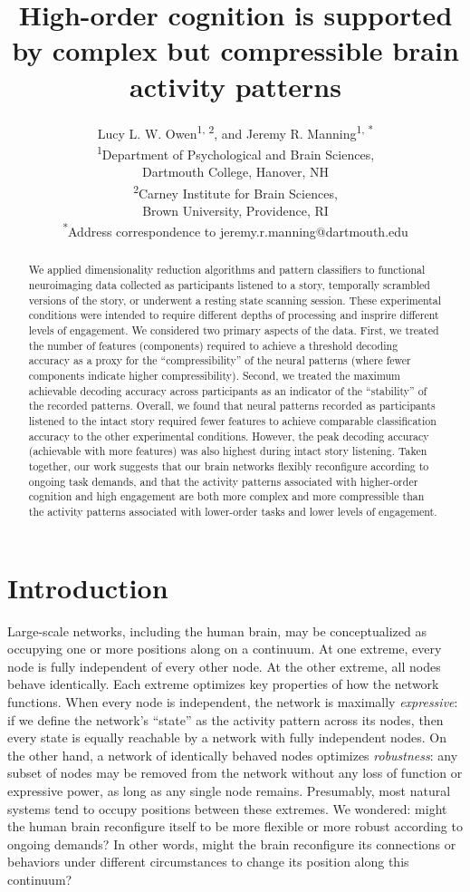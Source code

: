 \documentclass[english]{article}
\title{High-order cognition is supported by complex but compressible brain activity patterns}
\author{Lucy L. W. Owen\textsuperscript{1, 2}, and Jeremy R. Manning\textsuperscript{1,
*}\\\textsuperscript{1}Department of Psychological and Brain Sciences,\\Dartmouth College,
Hanover, NH\\[0.1cm]\textsuperscript{2}Carney Institute for Brain Sciences,\\Brown University,
Providence, RI\\[0.1cm] \textsuperscript{*}Address correspondence to
jeremy.r.manning@dartmouth.edu}
\begin{document}
\maketitle


\begin{abstract} 

We applied dimensionality reduction algorithms and pattern classifiers to
functional neuroimaging data collected as participants listened to a story,
temporally scrambled versions of the story, or underwent a resting state
scanning session. These experimental conditions were intended to require
different depths of processing and insprire different levels of engagement. We
considered two primary aspects of the data. First, we treated the number of
features (components) required to achieve a threshold decoding accuracy as a
proxy for the ``compressibility'' of the neural patterns (where fewer
components indicate higher compressibility). Second, we treated the maximum
achievable decoding accuracy across participants as an indicator of the
``stability'' of the recorded patterns. Overall, we found that neural patterns
recorded as participants listened to the intact story required fewer features
to achieve comparable classification accuracy to the other experimental
conditions. However, the peak decoding accuracy (achievable with more features)
was also highest during intact story listening. Taken together, our work
suggests that our brain networks flexibly reconfigure according to ongoing task
demands, and that the activity patterns associated with higher-order cognition
and high engagement are both more complex and more compressible than the
activity patterns associated with lower-order tasks and lower levels of
engagement.

\end{abstract}

\doublespacing

\section*{Introduction}

Large-scale networks, including the human brain, may be conceptualized as
occupying one or more positions along on a continuum. At one extreme, every
node is fully independent of every other node. At the other extreme, all nodes
behave identically. Each extreme optimizes key properties of how the network
functions. When every node is independent, the network is maximally
\textit{expressive}: if we define the network's ``state'' as the activity
pattern across its nodes, then every state is equally reachable by a network
with fully independent nodes. On the other hand, a network of identically
behaved nodes optimizes \textit{robustness}: any subset of nodes may be removed
from the network without any loss of function or expressive power, as long as
any single node remains. Presumably, most natural systems tend to occupy
positions between these extremes. We wondered: might the human brain
reconfigure itself to be more flexible or more robust according to ongoing
demands? In other words, might the brain reconfigure its connections or
behaviors under different circumstances to change its position along this
continuum?
\end{document}
